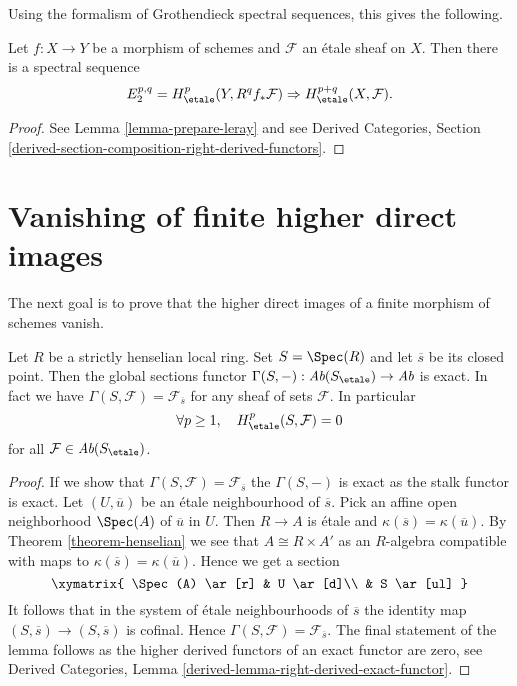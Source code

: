 \noindent
Using the formalism of Grothendieck spectral sequences, this gives the
following.

\begin{proposition}
\label{proposition-leray}
Let $f: X \to Y$ be a morphism of schemes and $\mathcal{F}$ an \'etale sheaf on
$X$. Then there is a spectral sequence
$$
E_2^{p, q} = H_\etale^p(Y, R^qf_*\mathcal{F}) \Rightarrow
H_\etale^{p+q}(X, \mathcal{F}).
$$
\end{proposition}

\begin{proof}
See Lemma \ref{lemma-prepare-leray} and see
Derived Categories, Section
\ref{derived-section-composition-right-derived-functors}.
\end{proof}









\section{Vanishing of finite higher direct images}
\label{section-vanishing-finite-morphism}

\noindent
The next goal is to prove that the higher direct images of a finite morphism of
schemes vanish.

\begin{lemma}
\label{lemma-vanishing-etale-cohomology-strictly-henselian}
Let $R$ be a strictly henselian local ring. Set $S = \Spec(R)$ and let
$\overline{s}$ be its closed point. Then the global
sections functor
$\Gamma(S, -) : \textit{Ab}(S_\etale) \to \textit{Ab}$
is exact. In fact we have $\Gamma(S, \mathcal{F}) = \mathcal{F}_{\overline{s}}$
for any sheaf of sets $\mathcal{F}$. In particular
$$
\forall p\geq 1, \quad H_\etale^p(S, \mathcal{F})=0
$$
for all $\mathcal{F}\in \textit{Ab}(S_\etale)$.
\end{lemma}

\begin{proof}
If we show that $\Gamma(S, \mathcal{F}) = \mathcal{F}_{\overline{s}}$
the $\Gamma(S, -)$ is exact as the stalk functor is exact.
Let $(U, \overline{u})$ be an \'etale neighbourhood of $\overline{s}$.
Pick an affine open neighborhood $\Spec(A)$ of $\overline{u}$ in $U$.
Then $R \to A$ is \'etale and $\kappa(\overline{s}) = \kappa(\overline{u})$.
By Theorem \ref{theorem-henselian} we see that $A \cong R \times A'$
as an $R$-algebra compatible with maps to
$\kappa(\overline{s}) = \kappa(\overline{u})$.
Hence we get a section
$$
\xymatrix{
\Spec(A) \ar[r] & U \ar[d]\\
& S \ar[ul]
}
$$
It follows that in the system of \'etale neighbourhoods of $\overline{s}$
the identity map $(S, \overline{s}) \to (S, \overline{s})$ is cofinal.
Hence $\Gamma(S, \mathcal{F}) = \mathcal{F}_{\overline{s}}$.
The final statement of the lemma follows as the higher derived
functors of an exact functor are zero, see
Derived Categories, Lemma \ref{derived-lemma-right-derived-exact-functor}.
\end{proof}

